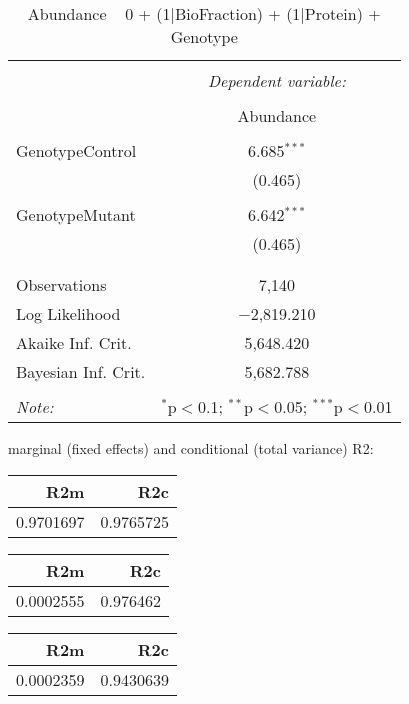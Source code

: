 \documentclass[11pt]{report}
\begin{document}
\begin{table}[!htbp] \centering 
  \caption{Abundance ~ 0 + (1|BioFraction) + (1|Protein) + Genotype} 
  \label{} 
\begin{tabular}{@{\extracolsep{5pt}}lc} 
\\[-1.8ex]\hline 
\hline \\[-1.8ex] 
 & \multicolumn{1}{c}{\textit{Dependent variable:}} \\ 
\cline{2-2} 
\\[-1.8ex] & Abundance \\ 
\hline \\[-1.8ex] 
 GenotypeControl & 6.685$^{***}$ \\ 
  & (0.465) \\ 
  & \\ 
 GenotypeMutant & 6.642$^{***}$ \\ 
  & (0.465) \\ 
  & \\ 
\hline \\[-1.8ex] 
Observations & 7,140 \\ 
Log Likelihood & $-$2,819.210 \\ 
Akaike Inf. Crit. & 5,648.420 \\ 
Bayesian Inf. Crit. & 5,682.788 \\ 
\hline 
\hline \\[-1.8ex] 
\textit{Note:}  & \multicolumn{1}{r}{$^{*}$p$<$0.1; $^{**}$p$<$0.05; $^{***}$p$<$0.01} \\ 
\end{tabular} 
\end{table} 
marginal (fixed effects) and conditional (total variance) R2:

\begin{tabular}{r|r}
\hline
R2m & R2c\\
\hline
0.9701697 & 0.9765725\\
\hline
\end{tabular}

\begin{tabular}{r|r}
\hline
R2m & R2c\\
\hline
0.0002555 & 0.976462\\
\hline
\end{tabular}

\begin{tabular}{r|r}
\hline
R2m & R2c\\
\hline
0.0002359 & 0.9430639\\
\hline
\end{tabular}
\end{document}
